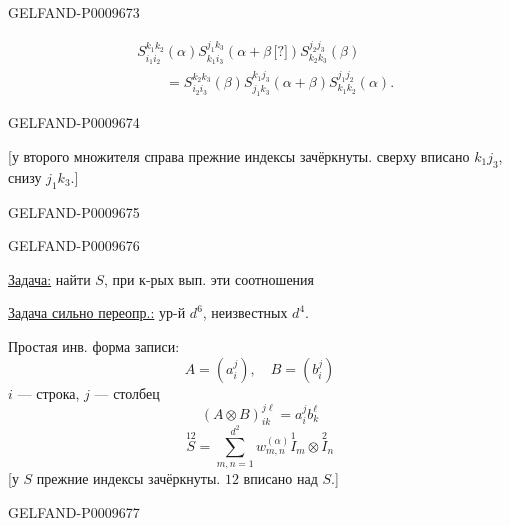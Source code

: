 \begin{GelfandAdjacentEvidence}{GELFAND-P000967}{3}

\begin{equation*}
\begin{aligned}
&S_{i_1i_2}^{k_1k_2}(\alpha)
 S_{k_1i_3}^{j_1k_3}(\alpha+\beta\,\text{[?]})
 S_{k_2k_3}^{j_2j_3}(\beta)\\
&\qquad=S_{i_2i_3}^{k_2k_3}(\beta)
 S_{j_1k_3}^{k_1j_3}(\alpha+\beta)
 S_{k_1k_2}^{j_1j_2}(\alpha).
\end{aligned}\tag{12}
\end{equation*}
\end{GelfandAdjacentEvidence}
\begin{GelfandAdjacentEvidence}{GELFAND-P000967}{4}


[у второго множителя справа прежние индексы зачёркнуты. сверху вписано $k_1j_3$, снизу $j_1k_3$.]
\end{GelfandAdjacentEvidence}
\begin{GelfandAdjacentEvidence}{GELFAND-P000967}{5}

\end{GelfandAdjacentEvidence}
\begin{GelfandAdjacentEvidence}{GELFAND-P000967}{6}


\underline{Задача:} найти $S$, при к-рых вып. эти соотношения

\underline{Задача сильно переопр.:} ур-й $d^6$, неизвестных $d^4$.

Простая инв. форма записи:
\begin{equation*}
 A=(a_i^j),\quad B=(b_i^j)\tag{13}
\end{equation*}
$i$ --- строка, $j$ --- столбец
\begin{equation*}
 (A\otimes B)_{ik}^{j\ell}=a_i^j b_k^\ell\tag{14}
\end{equation*}
\begin{equation*}
 \overset{12}{S}=\sum_{m,n=1}^{d^2}w_{m,n}^{(\alpha)}
   \overset{1}{I}_m\otimes\overset{2}{I}_n\tag{15}
\end{equation*}
[у $S$ прежние индексы зачёркнуты. $12$ вписано над $S$.]
\end{GelfandAdjacentEvidence}
\begin{GelfandAdjacentEvidence}{GELFAND-P000967}{7}

\end{GelfandAdjacentEvidence}


